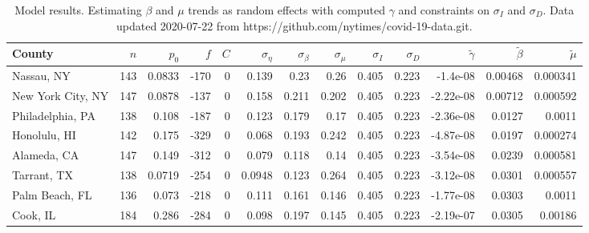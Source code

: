 \documentclass[12pt,letterpaper]{article}
\begin{document}
\begin{sidewaystable}
\caption{\label{tab:cons}
Model results. Estimating $\beta$ and $\mu$ trends as random effects with computed $\gamma$
and constraints on  $\sigma_I$ and $\sigma_D$. 
Data updated 2020-07-22 from
https://github.com/nytimes/covid-19-data.git.
}
\centering
{\small


\begin{tabular}{lrrrrrrrrrrrr}
\hline
 County            &   $n$ &   $p_0$ &    $f$ &   $C$ &   $\sigma_\eta$ &   $\sigma_\beta$ &   $\sigma_\mu$ &   $\sigma_I$ &   $\sigma_D$ &   $\tilde\gamma$ &   $\tilde{\beta}$ &   $\tilde{\mu}$ \\
\hline
 Nassau, NY        & 143   &  0.0833 & -170   &     0 &         0.139   &           0.23   &         0.26   &        0.405 &        0.223 &       -1.4e-08   &           0.00468 &       0.000341  \\
 New York City, NY & 147   &  0.0878 & -137   &     0 &         0.158   &           0.211  &         0.202  &        0.405 &        0.223 &       -2.22e-08  &           0.00712 &       0.000592  \\
 Philadelphia, PA  & 138   &  0.108  & -187   &     0 &         0.123   &           0.179  &         0.17   &        0.405 &        0.223 &       -2.36e-08  &           0.0127  &       0.0011    \\
 Honolulu, HI      & 142   &  0.175  & -329   &     0 &         0.068   &           0.193  &         0.242  &        0.405 &        0.223 &       -4.87e-08  &           0.0197  &       0.000274  \\
 Alameda, CA       & 147   &  0.149  & -312   &     0 &         0.079   &           0.118  &         0.14   &        0.405 &        0.223 &       -3.54e-08  &           0.0239  &       0.000581  \\
 Tarrant, TX       & 138   &  0.0719 & -254   &     0 &         0.0948  &           0.123  &         0.264  &        0.405 &        0.223 &       -3.12e-08  &           0.0301  &       0.000557  \\
 Palm Beach, FL    & 136   &  0.073  & -218   &     0 &         0.111   &           0.161  &         0.146  &        0.405 &        0.223 &       -1.77e-08  &           0.0303  &       0.0011    \\
 Cook, IL          & 184   &  0.286  & -284   &     0 &         0.098   &           0.197  &         0.145  &        0.405 &        0.223 &       -2.19e-07  &           0.0305  &       0.00186   \\

\end{tabular}}
\end{sidewaystable}
\end{document}
